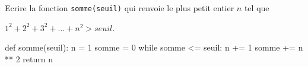 \documentclass[11pt, a4paper]{report}
\begin{document}
    \begin{minipage}{0.48\linewidth}
        \begin{exercice_cours}

Ecrire la fonction \verb|somme(seuil)| qui renvoie le plus petit entier $n$ tel que 

$1^2 + 2^2 + 3^2 + \ldots + n^2 > seuil$.
    \end{exercice_cours}

    \end{minipage}\hfill    
    \begin{minipage}{0.48\linewidth}
\begin{blocvisible}[height=4.5] 
    \begin{CodePythontexAlt}[TaillePolice=\large, Largeur=1\linewidth,Centre,Lignes=true,PremLigne=1]{}
def somme(seuil):
    n = 1
    somme = 0
    while somme <= seuil:
        n += 1
        somme += n ** 2
    return n
    \end{CodePythontexAlt}
\end{blocvisible}
    \end{minipage}     

    
    
\medskip
\end{document}
